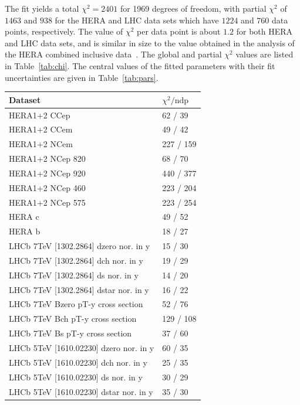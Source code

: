 \documentclass[12pt]{article}
\begin{document}
The fit yields a total $\chi^2 =2401$ for 1969 degrees of freedom, with partial $\chi^2$ of $1463$ and $938$ for the HERA and LHC data sets which have $1224$ and $760$ data points, respectively. The value
of $\chi^2$ per data point is about $1.2$ for both HERA and LHC data sets, and is similar in size to the value obtained in the analysis of the HERA combined inclusive data~\cite{Abramowicz:2015mha}. The global and partial $\chi^2$ values are listed in Table~\ref{tab:chi}. 
The central values of the fitted parameters with their fit uncertainties are given in Table~\ref{tab:pars}.

\begin{table}
\renewcommand*{\arraystretch}{1.12}
    \centering
\begin{tabular}{ll}
    Dataset & $\chi^2/\textrm{ndp}$ \\
    \hline
    HERA1+2 CCep & 62 / 39  \\ 
    HERA1+2 CCem & 49 / 42  \\ 
    HERA1+2 NCem & 227 / 159  \\ 
    HERA1+2 NCep 820 & 68 / 70  \\ 
    HERA1+2 NCep 920 & 440 / 377  \\ 
    HERA1+2 NCep 460 & 223 / 204  \\ 
    HERA1+2 NCep 575 & 223 / 254  \\ 
    HERA c & 49 / 52  \\ 
    HERA b & 18 / 27  \\ 
    LHCb 7TeV [1302.2864] dzero nor. in y & 15 / 30  \\ 
    LHCb 7TeV [1302.2864] dch nor. in y & 19 / 29  \\ 
    LHCb 7TeV [1302.2864] ds nor. in y & 14 / 20  \\ 
    LHCb 7TeV [1302.2864] dstar nor. in y & 16 / 22  \\ 
    LHCb 7TeV Bzero pT-y cross section & 52 / 76  \\ 
    LHCb 7TeV Bch pT-y cross section & 129 / 108  \\ 
    LHCb 7TeV Bs pT-y cross section & 37 / 60  \\ 
    LHCb 5TeV [1610.02230] dzero nor. in y & 60 / 35  \\ 
    LHCb 5TeV [1610.02230] dch nor. in y & 25 / 35  \\ 
    LHCb 5TeV [1610.02230] ds nor. in y & 30 / 29  \\ 
    LHCb 5TeV [1610.02230] dstar nor. in y & 35 / 30  \\ 

\end{tabular}
\end{table}
\end{document}
